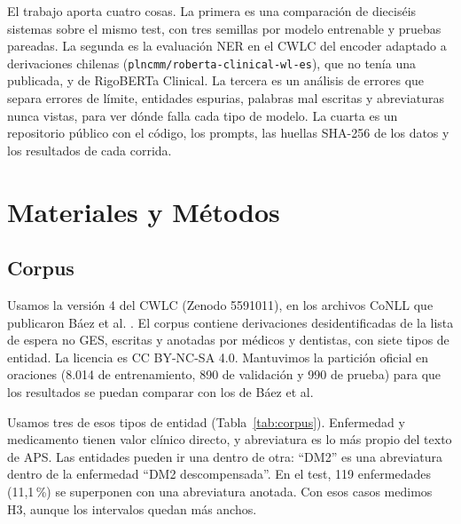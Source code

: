 \documentclass[10pt,journal,a4paper]{IEEEtran}
\begin{document}
El trabajo aporta cuatro cosas. La primera es una comparación de dieciséis sistemas sobre el mismo test, con tres semillas por modelo entrenable y pruebas pareadas. La segunda es la evaluación NER en el CWLC del encoder adaptado a derivaciones chilenas (\texttt{plncmm/roberta-clinical-wl-es}), que no tenía una publicada, y de RigoBERTa Clinical. La tercera es un análisis de errores que separa errores de límite, entidades espurias, palabras mal escritas y abreviaturas nunca vistas, para ver dónde falla cada tipo de modelo. La cuarta es un repositorio público con el código, los prompts, las huellas SHA-256 de los datos y los resultados de cada corrida.

\section{Materiales y M\'etodos}\label{sec:metodos}

\subsection{Corpus}

Usamos la versión 4 del CWLC (Zenodo 5591011), en los archivos CoNLL que publicaron Báez et al. \cite{baez2022}. El corpus contiene derivaciones desidentificadas de la lista de espera no GES, escritas y anotadas por médicos y dentistas, con siete tipos de entidad. La licencia es CC BY-NC-SA 4.0. Mantuvimos la partición oficial en oraciones (8.014 de entrenamiento, 890 de validación y 990 de prueba) para que los resultados se puedan comparar con los de Báez et al.

Usamos tres de esos tipos de entidad (Tabla~\ref{tab:corpus}). Enfermedad y medicamento tienen valor clínico directo, y abreviatura es lo más propio del texto de APS. Las entidades pueden ir una dentro de otra: ``DM2'' es una abreviatura dentro de la enfermedad ``DM2 descompensada''. En el test, 119 enfermedades (11,1\,\%) se superponen con una abreviatura anotada. Con esos casos medimos H3, aunque los intervalos quedan más anchos.
\end{document}
